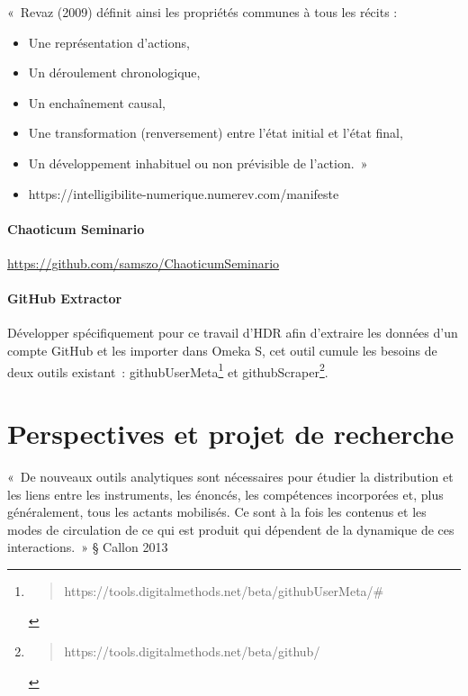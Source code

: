 \documentclass[
  letterpaper,
  DIV=11,
  numbers=noendperiod]{scrreprt}
\providecommand{\tightlist}{%
  \setlength{\itemsep}{0pt}\setlength{\parskip}{0pt}}\usepackage{longtable,booktabs,array}
\begin{document}
«~Revaz (2009) définit ainsi les propriétés communes à tous les récits :

\begin{itemize}
\tightlist
\item
  Une représentation d'actions,
\item
  Un déroulement chronologique,
\item
  Un enchaînement causal,
\item
  Une transformation (renversement) entre l'état initial et l'état
  final,
\item
  Un développement inhabituel ou non prévisible de l'action.~»
\item
  https://intelligibilite-numerique.numerev.com/manifeste
\end{itemize}

\hypertarget{sec-chaoticumSeminario}{%
\subsection{Chaoticum Seminario}\label{sec-chaoticumSeminario}}

\url{https://github.com/samszo/ChaoticumSeminario}

\hypertarget{github-extractor}{%
\subsection{GitHub Extractor}\label{github-extractor}}

Développer spécifiquement pour ce travail d'HDR afin d'extraire les
données d'un compte GitHub et les importer dans Omeka S, cet outil
cumule les besoins de deux outils existant~: githubUserMeta\footnote{\begin{quote}
  https://tools.digitalmethods.net/beta/githubUserMeta/\#
  \end{quote}} et githubScraper\footnote{\begin{quote}
  https://tools.digitalmethods.net/beta/github/
  \end{quote}}.

\part{Perspectives et projet de recherche}

«~De nouveaux outils analytiques sont nécessaires pour étudier la
distribution et les liens entre les instruments, les énoncés, les
compétences incorporées et, plus généralement, tous les actants
mobilisés. Ce sont à la fois les contenus et les modes de circulation de
ce qui est produit qui dépendent de la dynamique de ces interactions.~»
§ Callon 2013
\end{document}
